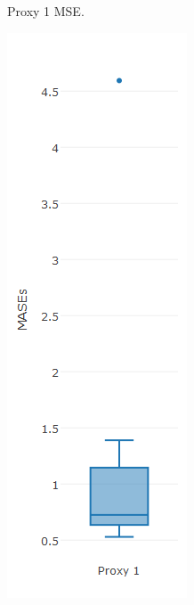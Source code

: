 \begin{figure}[!h]
{\begin{subfigure}{.25\linewidth}
  \caption{Proxy 1 MSE.}
  \label{fig:bp1}
\end{subfigure}%
\begin{subfigure}{.25\linewidth}
  \centering
  \includegraphics[width=\linewidth]{img/6msigmaMasebp.png}

\end{subfigure}}
\end{figure}
